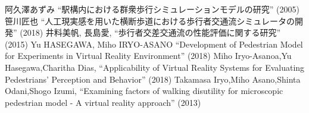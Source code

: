 ﻿%
\begin{thebibliography}{1}
 阿久澤あずみ
``駅構内における群衆歩行シミュレーションモデルの研究''
(2005)
 笹川匠也
``人工現実感を用いた横断歩道における歩行者交通流シミュレータの開発''
(2018)
 井料美帆, 長島愛,
``歩行者交差交通流の性能評価に関する研究''
(2015)
 Yu HASEGAWA, Miho IRYO-ASANO
``Development of Pedestrian Model for Experiments in Virtual Reality Environment'' (2018)
 Miho Iryo-Asanoa,Yu Hasegawa,Charitha Dias,
``Applicability of Virtual Reality Systems for Evaluating Pedestrians’ Perception and Behavior''
 (2018)
 Takamasa Iryo,Miho Asano,Shinta Odani,Shogo Izumi,
``Examining factors of walking disutility for microscopic pedestrian model - A virtual reality approach'' 
(2013)
\end{thebibliography}